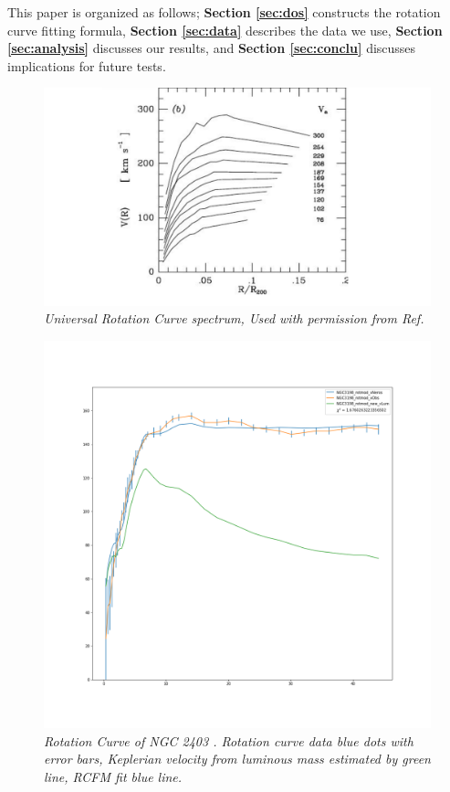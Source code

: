 \documentclass[reprint,%
 amsmath,amssymb,
 aps,
]{revtex4-1}
\begin{document}
 
This paper  is organized as follows;
{\bf Section \ref{sec:dos}} constructs  the rotation curve  fitting formula, 
{\bf Section \ref{sec:data}}   describes  the data we use, 
 {\bf Section \ref{sec:analysis}}   discusses our results, 
 and  {\bf Section \ref{sec:conclu}}   discusses implications for future tests.   
  
  
 \begin{figure}[h!]
     \centering
     \includegraphics[width=\linewidth]{URC}
     \caption{\emph{Universal Rotation Curve spectrum, Used with permission from Ref.\citep{salucci}}}
     \label{fig:URC}
\end{figure}
  

  
    
 \begin{figure}[h!]
      \centering
      \includegraphics[width=\linewidth]{figures/NGC3198_rotmod_XueSofue.png}
      \caption{\emph{Rotation Curve of NGC 2403 \cite{Blok1}.   Rotation curve data blue dots with  error bars,  Keplerian velocity from luminous mass estimated by   green line,   RCFM fit blue line.} }
      \label{fig:NGC2403}
  \end{figure}
\end{document}
